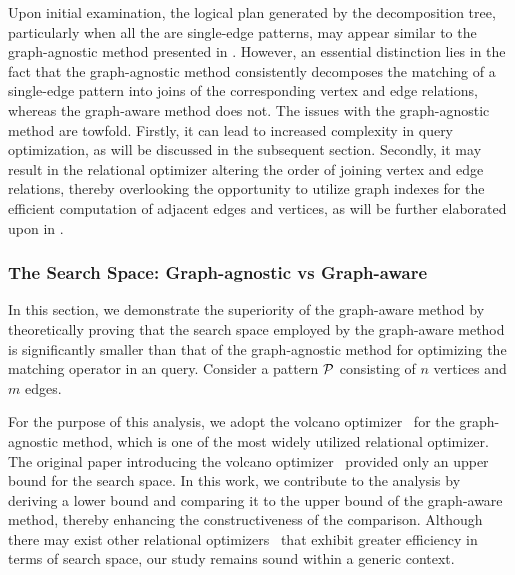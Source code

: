 \begin{example}
\end{example}

Upon initial examination, the logical plan generated by the decomposition tree, particularly when all the \mmcs are single-edge patterns,
may appear similar to the graph-agnostic method presented in . However, an essential distinction lies in the fact that the graph-agnostic method consistently decomposes the matching of a single-edge pattern into joins of the corresponding vertex and edge relations, whereas the graph-aware method does not. The issues with the graph-agnostic method are towfold. Firstly, it can lead to increased complexity in query optimization, as will be discussed in the subsequent section. Secondly, it may result in the relational optimizer altering the order of joining vertex and edge relations, thereby overlooking the opportunity to utilize graph indexes for the efficient computation of adjacent edges and vertices, as will be further elaborated upon in .

\subsubsection{The Search Space: Graph-agnostic vs Graph-aware}
\label{sec:compare-search-space}

In this section, we demonstrate the superiority of the graph-aware method by theoretically proving that the search space employed by the graph-aware method is significantly smaller than that of the graph-agnostic method for optimizing the matching operator in an \spjm query.
Consider a pattern $\mathcal{P}$ consisting of $n$ vertices and $m$ edges.

For the purpose of this analysis, we adopt the volcano optimizer~\cite{columbia} for the graph-agnostic method, which is one of the most widely utilized relational optimizer. The original paper introducing the volcano optimizer~\cite{columbia} provided only an upper bound for the search space. In this work, we contribute to the analysis by deriving a lower bound and comparing it to the upper bound of the graph-aware method, thereby enhancing the constructiveness of the comparison. Although there may exist other relational optimizers~\cite{xx} that exhibit greater efficiency in terms of search space, our study remains sound within a generic context.

